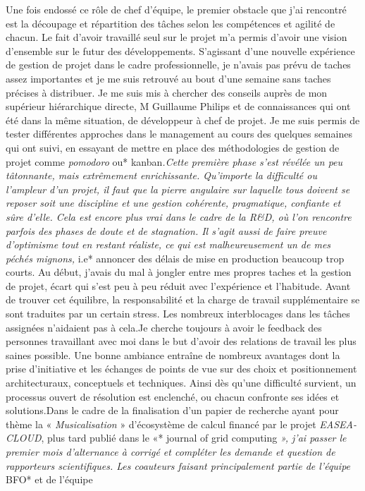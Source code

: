 \documentclass[french, 11pt]{memoir}
\begin{document}
Une fois endossé ce rôle de chef d'équipe, le premier obstacle que j'ai
rencontré est la découpage et répartition des tâches selon les
compétences et agilité de chacun. Le fait d'avoir travaillé seul sur le
projet m'a permis d'avoir une vision d'ensemble sur le futur des
développements. S'agissant d'une nouvelle expérience de gestion de
projet dans le cadre professionnelle, je n'avais pas prévu de taches
assez importantes et je me suis retrouvé au bout d'une semaine sans
taches précises à distribuer. Je me suis mis à chercher des conseils
auprès de mon supérieur hiérarchique directe, M Guillaume Philips et de
connaissances qui ont été dans la même situation, de développeur à chef
de projet. Je me suis permis de tester différentes approches dans le
management au cours des quelques semaines qui ont suivi, en essayant de
mettre en place des méthodologies de gestion de projet comme
\emph{pomodoro }ou* kanban\emph{.Cette première phase s'est révélée un
	peu tâtonnante, mais extrêmement enrichissante. Qu'importe la difficulté
	ou l'ampleur d'un projet, il faut que la pierre angulaire sur laquelle
	tous doivent se reposer soit une discipline et une gestion cohérente,
	pragmatique, confiante et sûre d'elle. Cela est encore plus vrai dans le
	cadre de la R\&D, où l'on rencontre parfois des phases de doute et de
	stagnation. Il s'agit aussi de faire preuve d'optimisme tout en restant
	réaliste, ce qui est malheureusement un de mes péchés mignons, }i.e*
annoncer des délais de mise en production beaucoup trop courts. Au
début, j'avais du mal à jongler entre mes propres taches et la gestion
de projet, écart qui s'est peu à peu réduit avec l'expérience et
l'habitude. Avant de trouver cet équilibre, la responsabilité et la
charge de travail supplémentaire se sont traduites par un certain
stress. Les nombreux interblocages dans les tâches assignées n'aidaient
pas à cela.Je cherche toujours à avoir le feedback des personnes
travaillant avec moi dans le but d'avoir des relations de travail les
plus saines possible. Une bonne ambiance entraîne de nombreux avantages
dont la prise d'initiative et les échanges de points de vue sur des
choix et positionnement architecturaux, conceptuels et techniques. Ainsi
dès qu'une difficulté survient, un processus ouvert de résolution est
enclenché, ou chacun confronte ses idées et solutions.Dans le cadre de
la finalisation d'un papier de recherche ayant pour thème la «
\emph{Musicalisation} » d'écosystème de calcul financé par le projet
\emph{EASEA-CLOUD}, plus tard publié dans le «* journal of grid
computing \emph{», j'ai passer le premier mois d'alternance à corrigé et
	compléter les demande et question de rapporteurs scientifiques. Les
	coauteurs faisant principalement partie de l'équipe }BFO* et de l'équipe
\end{document}

